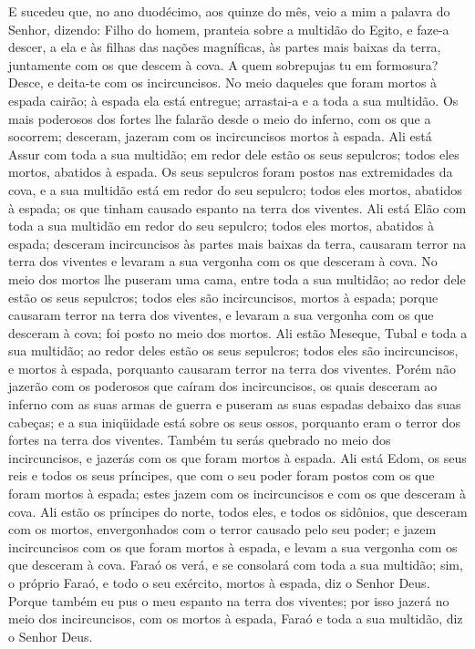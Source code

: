 E sucedeu que, no ano duodécimo, aos quinze do mês, veio a mim a
palavra do Senhor, dizendo: Filho do homem, pranteia sobre a
multidão do Egito, e faze-a descer, a ela e às filhas das nações
magníficas, às partes mais baixas da terra, juntamente com os que
descem à cova. A quem sobrepujas tu em formosura? Desce, e
deita-te com os incircuncisos. No meio daqueles que foram
mortos à espada cairão; à espada ela está entregue; arrastai-a e a
toda a sua multidão. Os mais poderosos dos fortes lhe falarão
desde o meio do inferno, com os que a socorrem; desceram, jazeram
com os incircuncisos mortos à espada. Ali está Assur com toda
a sua multidão; em redor dele estão os seus sepulcros; todos eles
mortos, abatidos à espada. Os seus sepulcros foram postos nas
extremidades da cova, e a sua multidão está em redor do seu
sepulcro; todos eles mortos, abatidos à espada; os que tinham
causado espanto na terra dos viventes. Ali está Elão com toda
a sua multidão em redor do seu sepulcro; todos eles mortos, abatidos
à espada; desceram incircuncisos às partes mais baixas da terra,
causaram terror na terra dos viventes e levaram a sua vergonha com
os que desceram à cova. No meio dos mortos lhe puseram uma
cama, entre toda a sua multidão; ao redor dele estão os seus
sepulcros; todos eles são incircuncisos, mortos à espada; porque
causaram terror na terra dos viventes, e levaram a sua vergonha com
os que desceram à cova; foi posto no meio dos mortos. Ali
estão Meseque, Tubal e toda a sua multidão; ao redor deles estão os
seus sepulcros; todos eles são incircuncisos, e mortos à espada,
porquanto causaram terror na terra dos viventes. Porém não
jazerão com os poderosos que caíram dos incircuncisos, os quais
desceram ao inferno com as suas armas de guerra e puseram as suas
espadas debaixo das suas cabeças; e a sua iniqüidade está sobre os
seus ossos, porquanto eram o terror dos fortes na terra dos
viventes. Também tu serás quebrado no meio dos incircuncisos,
e jazerás com os que foram mortos à espada. Ali está Edom, os
seus reis e todos os seus príncipes, que com o seu poder foram
postos com os que foram mortos à espada; estes jazem com os
incircuncisos e com os que desceram à cova. Ali estão os
príncipes do norte, todos eles, e todos os sidônios, que desceram
com os mortos, envergonhados com o terror causado pelo seu poder; e
jazem incircuncisos com os que foram mortos à espada, e levam a sua
vergonha com os que desceram à cova. Faraó os verá, e se
consolará com toda a sua multidão; sim, o próprio Faraó, e todo o
seu exército, mortos à espada, diz o Senhor Deus. Porque
também eu pus o meu espanto na terra dos viventes; por isso jazerá
no meio dos incircuncisos, com os mortos à espada, Faraó e toda a
sua multidão, diz o Senhor Deus.


